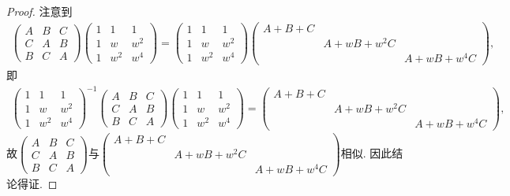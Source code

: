 \documentclass[../../main.tex]{subfiles}%
\begin{document}
\begin{proof}
注意到
\begin{align*}
\begin{pmatrix}
A & B & C \\
C & A & B \\
B & C & A
\end{pmatrix}
\begin{pmatrix}
1 & 1 & 1 \\
1 & w & w^2 \\
1 & w^2 & w^4
\end{pmatrix}
=
\begin{pmatrix}
1 & 1 & 1 \\
1 & w & w^2 \\
1 & w^2 & w^4
\end{pmatrix}
\begin{pmatrix}
A+B+C & & \\
& A+wB+w^2C & \\
& & A+wB+w^4C
\end{pmatrix},
\end{align*}
即
\begin{align*}
\begin{pmatrix}
1 & 1 & 1 \\
1 & w & w^2 \\
1 & w^2 & w^4
\end{pmatrix}^{-1}
\begin{pmatrix}
A & B & C \\
C & A & B \\
B & C & A
\end{pmatrix}
\begin{pmatrix}
1 & 1 & 1 \\
1 & w & w^2 \\
1 & w^2 & w^4
\end{pmatrix}
=
\begin{pmatrix}
A+B+C & & \\
& A+wB+w^2C & \\
& & A+wB+w^4C
\end{pmatrix},
\end{align*}
故$\begin{pmatrix}
A & B & C \\
C & A & B \\
B & C & A
\end{pmatrix}$与$\begin{pmatrix}
A+B+C & & \\
& A+wB+w^2C & \\
& & A+wB+w^4C
\end{pmatrix}$相似. 因此结论得证.
\end{proof}
\end{document}
